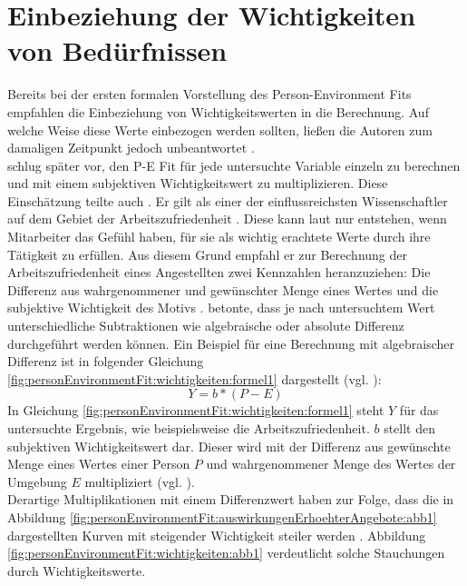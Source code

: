 \section{Einbeziehung der Wichtigkeiten von Bedürfnissen}
\label{ch:personEnvironmentFit:wichtigkeiten}
Bereits bei der ersten formalen Vorstellung des Person-Environment Fits empfahlen \textcite{copingAndAdaption:1974} die Einbeziehung von Wichtigkeitswerten in die Berechnung. Auf welche Weise diese Werte einbezogen werden sollten, ließen die Autoren zum damaligen Zeitpunkt jedoch unbeantwortet \cite[S. 19]{edwards:2008}.\\
\textcite[S. 38]{harrison:1985} schlug später vor, den P-E Fit für jede untersuchte Variable einzeln zu berechnen und mit einem subjektiven Wichtigkeitswert zu multiplizieren. Diese Einschätzung teilte auch \textcite[S. 18]{locke:1969}\cite[S. 8f.]{locke:1976}. Er gilt als einer der einflussreichsten Wissenschaftler auf dem Gebiet der Arbeitszufriedenheit \cite[S. 12]{edwards:2008}. Diese kann laut \textcite[S. 8]{locke:1969} nur entstehen, wenn Mitarbeiter das Gefühl haben, für sie als wichtig erachtete Werte durch ihre Tätigkeit zu erfüllen. Aus diesem Grund empfahl er zur Berechnung der Arbeitszufriedenheit eines Angestellten zwei Kennzahlen heranzuziehen: Die Differenz aus wahrgenommener und gewünschter Menge eines Wertes und die subjektive Wichtigkeit des Motivs \cite[S. 8]{locke:1976}. \textcite[S. 16]{locke:1969} betonte, dass je nach untersuchtem Wert unterschiedliche Subtraktionen wie algebraische oder absolute Differenz durchgeführt werden können. Ein Beispiel für eine Berechnung mit algebraischer Differenz ist in folgender Gleichung \ref{fig:personEnvironmentFit:wichtigkeiten:formel1} dargestellt (vgl. \cite[S. 9]{edwards:1990}):
\begin{equation}
	Y = b * (P - E)
	\label{fig:personEnvironmentFit:wichtigkeiten:formel1}
\end{equation}
In Gleichung \ref{fig:personEnvironmentFit:wichtigkeiten:formel1} steht $Y$ für das untersuchte Ergebnis, wie beispielsweise die Arbeitszufriedenheit. $b$ stellt den subjektiven Wichtigkeitswert dar. Dieser wird mit der Differenz aus gewünschte Menge eines Wertes einer Person $P$ und wahrgenommener Menge des Wertes der Umgebung $E$ multipliziert (vgl. \cite[S. 9f.]{edwards:1990}).\\
Derartige Multiplikationen mit einem Differenzwert haben zur Folge, dass die in Abbildung \ref{fig:personEnvironmentFit:auswirkungenErhoehterAngebote:abb1} dargestellten Kurven mit steigender Wichtigkeit steiler werden \cite[S. 9]{locke:1976}. Abbildung \ref{fig:personEnvironmentFit:wichtigkeiten:abb1} verdeutlicht solche Stauchungen durch Wichtigkeitswerte.\\
